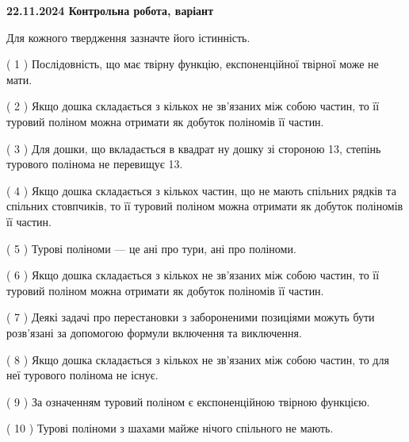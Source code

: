 \documentclass[12pt, ukrainian]{article}
\begin{document}
\vspace{4mm}
\newpage
\begin {large}

\textbf{22.11.2024 Контрольна робота, варіант  }\par


{
Для кожного твердження зазначте його істинність.\par
\vspace{2mm}
( 1 ) Послідовність, що має твірну функцію, експоненційної твірної може не мати.%

( 2 ) Якщо дошка складається з кількох не зв’язаних між собою частин, то її туровий поліном можна отримати як добуток поліномів її частин.%

( 3 ) Для дошки, що вкладається в квадрат ну дошку зі стороною 13, степінь турового полінома не перевищує 13.%

( 4 ) Якщо дошка складається з кількох частин, що не мають спільних рядків та спільних стовпчиків, то її туровий поліном можна отримати як добуток поліномів її частин.%

( 5 ) Турові поліноми --- це ані про тури, ані про поліноми.%

( 6 ) Якщо дошка складається з кількох не зв’язаних між собою частин, то її туровий поліном можна отримати як добуток поліномів її частин.%

( 7 ) Деякі задачі про перестановки з забороненими позиціями можуть бути розв’я\-за\-ні за допомогою формули включення та виключення.%

( 8 ) Якщо дошка складається з кількох не зв’язаних між собою частин, то для неї турового полінома не існує.%

( 9 ) За означенням туровий поліном є експоненційною твірною функцією.%

( 10 ) Турові поліноми з шахами майже нічого спільного не мають.%


\vspace{5mm}
}
\end {large}
\end{document}
